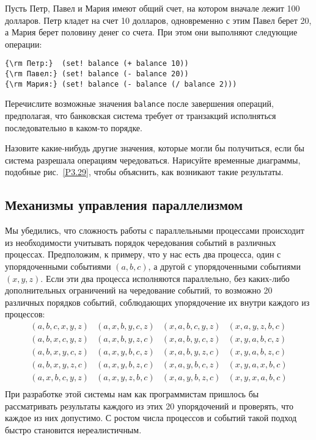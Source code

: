\begin{exercise}{3.38}\label{EX3.38}%
Пусть Петр, Павел и Мария имеют общий счет, на котором
вначале лежит 100 долларов.  Петр кладет на
счет 10 долларов, одновременно с этим Павел берет 20, а Мария берет половину денег со
счета.  При этом они выполняют следующие операции:

\begin{Verbatim}[fontsize=\small]
{\rm Петр:}  (set! balance (+ balance 10))
{\rm Павел:} (set! balance (- balance 20))
{\rm Мария:} (set! balance (- balance (/ balance 2)))
\end{Verbatim}

\begin{plainenum}


\item
Перечислите возможные значения
{\tt balance} после завершения операций, предполагая, что
банковская система требует от транзакций исполняться последовательно в
каком-то порядке.

\item
 Назовите какие-нибудь другие значения, которые
могли бы получиться, если бы система разрешала операциям
чередоваться.  Нарисуйте временные диаграммы, подобные
рис.~\ref{P3.29}, чтобы объяснить, как возникают
такие результаты.
\end{plainenum}
\end{exercise}

\subsection{Механизмы управления параллелизмом}
\label{MECHANISMS-FOR-CONTROLLING-CONCURRENCY}


Мы убедились, что сложность работы с параллельными
процессами происходит из необходимости учитывать порядок чередования
событий в различных процессах.  Предположим, к примеру, что у нас есть
два процесса, один с упорядоченными событиями $(a, b, c)$, а
другой с упорядоченными событиями $(x, y, z)$.  Если эти
два процесса исполняются параллельно, без каких-либо дополнительных
ограничений на чередование событий, то возможно 20 различных порядков
событий, соблюдающих упорядочение их внутри каждого из процессов:
$$
\begin{array}{cccc}
(a, b, c, x, y, z) & (a, x, b, y, c, z) & (x, a, b, c, y, z) & (x, a, y, z, b, c)\\
(a, b, x, c, y, z) & (a, x, b, y, z, c) & (x, a, b, y, c, z) & (x, y, a, b, c, z)\\
(a, b, x, y, c, z) & (a, x, y, b, c, z) & (x, a, b, y, z, c) & (x, y, a, b, z, c)\\
(a, b, x, y, z, c) & (a, x, y, b, z, c) & (x, a, y, b, c, z) & (x, y, a, x, b, c)\\
(a, x, b, c, y, z) & (a, x, y, z, b, c) & (x, a, y, b, z, c) & (x, y, x, a, b, c)\\
\end{array}
$$
 При разработке этой системы нам как программистам пришлось бы
рассматривать результаты каждого из этих 20 упорядочений и проверять,
что каждое из них допустимо.  С ростом числа процессов и событий такой
подход быстро становится нереалистичным.

